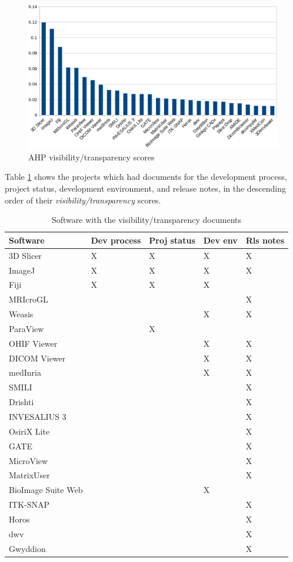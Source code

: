 \begin{figure}[H]
\includegraphics[scale=0.38]{figures/visibility_transparency_scores.png}
\caption{AHP visibility/transparency scores}
\label{fg_visibility_transparency_scores}
\end{figure}

Table \ref{tab_Visibility/Transparency_docs} shows the projects which had documents for the development process, project status, development environment, and release notes, in the descending order of their \textit{visibility/transparency} scores.

\begin{table}[H]
\centering
\begin{tabular}{lllll}
\hline
Software & Dev process & Proj status & Dev env & Rls notes \\ \hline
3D Slicer & X & X & X & X \\
ImageJ & X & X & X & X \\
Fiji & X & X & X &  \\
MRIcroGL &  &  &  & X \\
Weasis &  &  & X & X \\
ParaView &  & X &  &  \\
OHIF Viewer &  &  & X & X \\
DICOM Viewer &  &  & X & X \\
medInria &  &  & X & X \\
SMILI &  &  &  & X \\
Drishti &  &  &  & X \\
INVESALIUS 3 &  &  &  & X \\
OsiriX Lite &  &  &  & X \\
GATE &  &  &  & X \\
MicroView &  &  &  & X \\
MatrixUser &  &  &  & X \\
BioImage Suite Web &  &  & X &  \\
ITK-SNAP &  &  &  & X \\
Horos &  &  &  & X \\
dwv &  &  &  & X \\
Gwyddion &  &  &  & X \\ \hline
\end{tabular}
\caption{\label{tab_Visibility/Transparency_docs}Software with the visibility/transparency documents}
\end{table}


